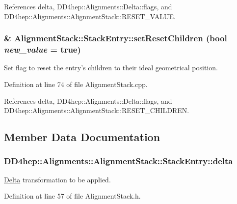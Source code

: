 References delta, DD4hep::Alignments::Delta::flags, and DD4hep::Alignments::AlignmentStack::RESET\_\-VALUE.\hypertarget{struct_d_d4hep_1_1_alignments_1_1_alignment_stack_1_1_stack_entry_ad594ba553b888a578b961d11db56c3c9}{
\subsubsection[{setResetChildren}]{ \& AlignmentStack::StackEntry::setResetChildren (bool {\em new\_\-value} = {\ttfamily true})}}
\label{struct_d_d4hep_1_1_alignments_1_1_alignment_stack_1_1_stack_entry_ad594ba553b888a578b961d11db56c3c9}


Set flag to reset the entry's children to their ideal geometrical position. 

Definition at line 74 of file AlignmentStack.cpp.

References delta, DD4hep::Alignments::Delta::flags, and DD4hep::Alignments::AlignmentStack::RESET\_\-CHILDREN.

\subsection{Member Data Documentation}
\hypertarget{struct_d_d4hep_1_1_alignments_1_1_alignment_stack_1_1_stack_entry_a4ef9eea2ab457bd908d8050f5a5d553e}{
\subsubsection[{delta}]{ {\bf DD4hep::Alignments::AlignmentStack::StackEntry::delta}}}
\label{struct_d_d4hep_1_1_alignments_1_1_alignment_stack_1_1_stack_entry_a4ef9eea2ab457bd908d8050f5a5d553e}


\hyperlink{class_d_d4hep_1_1_alignments_1_1_delta}{Delta} transformation to be applied. 

Definition at line 57 of file AlignmentStack.h.


